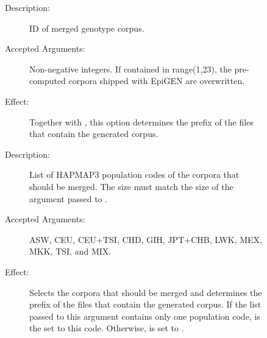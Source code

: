 \documentclass[a4paper,10pt,english]{sphinxhowto}
\begin{document}
\begin{sphinxVerbatim}[commandchars=\\\{\}]
  \PYG{p}{[} \PYG{p}{]} \PYG{p}{[} \PYG{p}{]}
\end{sphinxVerbatim}
\begin{description}
\item[{}] \leavevmode\begin{description}
\item[{}] \leavevmode\begin{description}
\item[{Description:}] \leavevmode
ID of merged genotype corpus.

\item[{Accepted Arguments:}] \leavevmode
Non-negative integers. If contained in range(1,23), the pre-computed corpora shipped with EpiGEN are overwritten.

\item[{Effect:}] \leavevmode
Together with , this option determines the prefix  of the files
that contain the generated corpus.

\end{description}

\item[{}] \leavevmode\begin{description}
\item[{Description:}] \leavevmode
List of HAPMAP3 population codes of the corpora that should be merged.
The size must match the size of the argument passed to .

\item[{Accepted Arguments:}] \leavevmode
ASW, CEU, CEU+TSI, CHD, GIH, JPT+CHB, LWK, MEX, MKK, TSI, and MIX.

\item[{Effect:}] \leavevmode
Selects the corpora that should be merged and determines the prefix  of the files
that contain the generated corpus. If the list passed to this argument contains only one population code,
 is the set to this code. Otherwise,  is set to .


\end{description}
\end{description}
\end{description}
\end{document}
